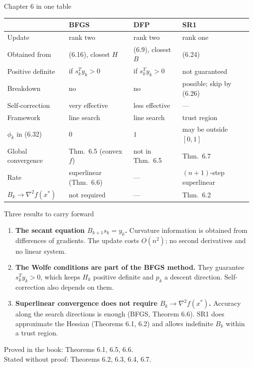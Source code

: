 \documentclass[aspectratio=169,12pt]{beamer}
\newcommand{\xs}{x^{*}}
\newcommand{\hessf}{\nabla^{2} f}
\begin{document}
\begin{frame}{Chapter 6 in one table}
  \begin{center}
  \small\setlength\tabcolsep{5pt}
  \begin{tabular}{llll}
    \toprule
    & BFGS & DFP & SR1 \\
    \midrule
    Update & rank two & rank two & rank one \\
    Obtained from & (6.16), closest $H$ & (6.9), closest $B$ & (6.24) \\
    Positive definite & if $s_{k}^{T}y_{k}>0$ & if $s_{k}^{T}y_{k}>0$ & not guaranteed \\
    Breakdown & no & no & possible; skip by (6.26) \\
    Self-correction & very effective & less effective & --- \\
    Framework & line search & line search & trust region \\
    $\phi_{k}$ in (6.32) & $0$ & $1$ & may be outside $[0,1]$ \\
    Global convergence & Thm.~6.5 (convex $f$) & not in Thm.~6.5 & Thm.~6.7 \\
    Rate & superlinear (Thm.~6.6) & --- & $(n{+}1)$-step superlinear \\
    $B_{k}\to\hessf(\xs)$ & not required & --- & Thm.~6.2 \\
    \bottomrule
  \end{tabular}
  \end{center}

\end{frame}

\begin{frame}{Three results to carry forward}
  \begin{enumerate}\setlength\itemsep{0.7em}
    \item \textbf{The secant equation $B_{k+1}s_{k}=y_{k}$.} Curvature information is obtained from
      differences of gradients. The update costs $O(n^{2})$; no second derivatives and no
      linear system.
    \item \textbf{The Wolfe conditions are part of the BFGS method.} They guarantee
      $s_{k}^{T}y_{k}>0$, which keeps $H_{k}$ positive definite and $p_{k}$ a descent direction.
      Self-correction also depends on them.
    \item \textbf{Superlinear convergence does not require $B_{k}\to\hessf(\xs)$.} Accuracy along the
      search directions is enough (BFGS, Theorem 6.6). SR1 does approximate the
      Hessian (Theorems 6.1, 6.2) and allows indefinite $B_{k}$ within a trust region.
  \end{enumerate}

  \vspace{0.8em}
  Proved in the book: Theorems 6.1, 6.5, 6.6.\\ Stated without proof: Theorems 6.2, 6.3, 6.4, 6.7.
\end{frame}
\end{document}
